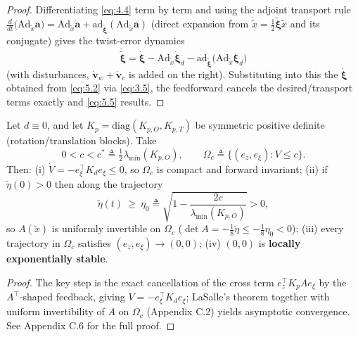 \begin{proof}
Differentiating \eqref{eq:4.4} term by term and using the adjoint transport rule
$\frac{d}{dt}\bigl(\mathrm{Ad}_{\tilde x}\boldsymbol a\bigr)=\mathrm{Ad}_{\tilde x}\dot{\boldsymbol a}+\mathrm{ad}_{\tilde{\boldsymbol\xi}}(\mathrm{Ad}_{\tilde x}\boldsymbol a)$
(direct expansion from $\dot{\tilde x}=\tfrac12\tilde{\boldsymbol\xi}\tilde x$ and its conjugate) gives the twist-error dynamics
\begin{equation}
\dot{\tilde{\boldsymbol\xi}}=\dot{\boldsymbol\xi}-\mathrm{Ad}_{\tilde x}\dot{\boldsymbol\xi}_d-\mathrm{ad}_{\tilde{\boldsymbol\xi}}\bigl(\mathrm{Ad}_{\tilde x}\boldsymbol\xi_d\bigr)
\tag{5.5a}\label{eq:5.5a}
\end{equation}
(with disturbances, $\dot{\boldsymbol v}_w+\dot{\boldsymbol v}_c$ is added on the right). Substituting into this the $\dot{\boldsymbol\xi}$ obtained from \eqref{eq:5.2} via \eqref{eq:3.5}, the feedforward cancels the desired/transport terms exactly and \eqref{eq:5.5} results.
\end{proof}

\renewcommand{\thetheorem}{3(b)}%
\begin{theorem}\label{thm:3b}
Let $d\equiv0$, and let $K_p=\mathrm{diag}(K_{p,O},K_{p,T})$ be symmetric positive definite (rotation/translation blocks). Take
\begin{equation}
0<c<c^{*}\triangleq\tfrac12\lambda_{\min}(K_{p,O}),
\qquad
\Omega_c\triangleq\{(e_z,e_\xi):V\le c\}.
\tag{5.5b}\label{eq:5.5b}
\end{equation}
Then: (i) $\dot V=-e_\xi^\top K_de_\xi\le0$, so $\Omega_c$ is compact and forward invariant; (ii) if $\tilde\eta(0)>0$ then along the trajectory
\begin{equation}
\tilde\eta(t)\ \ge\ \eta_0\triangleq\sqrt{1-\frac{2c}{\lambda_{\min}(K_{p,O})}}>0 ,
\tag{5.5c}\label{eq:5.5c}
\end{equation}
so $A(\tilde x)$ is uniformly invertible on $\Omega_c$ ($\det A=-\tfrac18\tilde\eta\le-\tfrac18\eta_0<0$); (iii) every trajectory in $\Omega_c$ satisfies $(e_z,e_\xi)\to(0,0)$; (iv) $(0,0)$ is \textbf{locally exponentially stable}.
\end{theorem}

\begin{proof}
The key step is the exact cancellation of the cross term $e_z^\top K_pAe_\xi$ by the $A^\top$-shaped feedback, giving $\dot V=-e_\xi^\top K_de_\xi$; LaSalle's theorem together with uniform invertibility of $A$ on $\Omega_c$ (Appendix C.2) yields asymptotic convergence. See Appendix C.6 for the full proof.
\end{proof}

